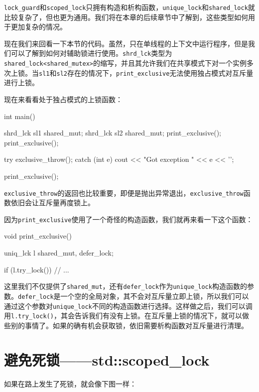 \texttt{lock\_guard}和\texttt{scoped\_lock}只拥有构造和析构函数，\texttt{unique\_lock}和\texttt{shared\_lock}就比较复杂了，但也更为通用。我们将在本章的后续章节中了解到，这些类型如何用于更加复杂的情况。

现在我们来回看一下本节的代码。虽然，只在单线程的上下文中运行程序，但是我们可以了解到如何对辅助锁进行使用。\texttt{shrd\_lck}类型为\texttt{shared\_lock<shared\_mutex>}的缩写，并且其允许我们在共享模式下对一个实例多次上锁。当\texttt{sl1}和\texttt{sl2}存在的情况下，\texttt{print\_exclusive}无法使用独占模式对互斥量进行上锁。

现在来看看处于独占模式的上锁函数：

\begin{codebox}[cpp]
int main()
{
    {
        shrd_lck sl1 {shared_mut};
        {
            shrd_lck sl2 {shared_mut};
            print_exclusive();
        }
        print_exclusive();
    }
    
    try {
        exclusive_throw();
    } catch (int e) {
        cout << "Got exception " << e << '\n';
    }
    
    print_exclusive();
}
\end{codebox}

\texttt{exclusive\_throw}的返回也比较重要，即便是抛出异常退出，\texttt{exclusive\_throw}函数依旧会让互斥量再度锁上。

因为\texttt{print\_exclusive}使用了一个奇怪的构造函数，我们就再来看一下这个函数：

\begin{codebox}[cpp]
void print_exclusive()
{
    uniq_lck l {shared_mut, defer_lock};
    
    if (l.try_lock()) {
        // ...
    }
}   
\end{codebox}

这里我们不仅提供了\texttt{shared\_mut}，还有\texttt{defer\_lock}作为\texttt{unique\_lock}构造函数的参数。\texttt{defer\_lock}是一个空的全局对象，其不会对互斥量立即上锁，所以我们可以通过这个参数对\texttt{unique\_lock}不同的构造函数进行选择。这样做之后，我们可以调用\texttt{l.try\_lock()}，其会告诉我们有没有上锁。在互斥量上锁的情况下，就可以做些别的事情了。如果的确有机会获取锁，依旧需要析构函数对互斥量进行清理。


\section{避免死锁——std::scoped\_lock}

如果在路上发生了死锁，就会像下图一样：

